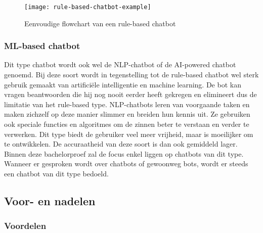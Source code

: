 \begin{figure}[!htbp]
    \label{fig:rule-based-chatbot-example}
    \centering
    \texttt{[image: rule-based-chatbot-example]}
    \caption{Eenvoudige flowchart van een rule-based chatbot \autocite{Shridhar2017}}
\end{figure}

\subsubsection{ML-based chatbot}
\label{subsubsec:chatbots-soorten-ml-based-chatbot}


Dit type chatbot wordt ook wel de NLP-chatbot of de AI-powered chatbot genoemd. Bij deze soort wordt in tegenstelling tot de rule-based chatbot wel sterk gebruik gemaakt van artificiële intelligentie en machine learning. De bot kan vragen beantwoorden die hij nog nooit eerder heeft gekregen en elimineert dus de limitatie van het rule-based type. NLP-chatbots leren van voorgaande taken en maken zichzelf op deze manier slimmer en breiden hun kennis uit. Ze gebruiken ook speciale functies en algoritmes om de zinnen beter te verstaan en verder te verwerken. Dit type biedt de gebruiker veel meer vrijheid, maar is moeilijker om te ontwikkelen. De accuraatheid van deze soort is dan ook gemiddeld lager. Binnen deze bachelorproef zal de focus enkel liggen op chatbots van dit type. Wanneer er gesproken wordt over chatbots of gewoonweg bots, wordt er steeds een chatbot van dit type bedoeld.

\subsection{Voor- en nadelen}
\label{subsec:chatbots-voor-en-nadelen}

\subsubsection{Voordelen}
\label{subsubsec:chatbots-voor-en-nadelen-voordelen}

